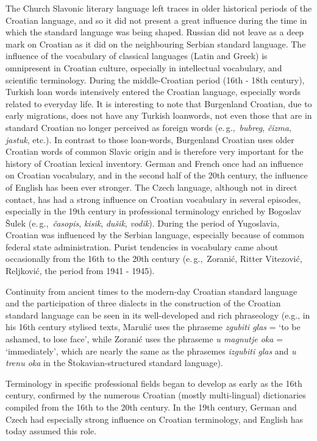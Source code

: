\begin{multicols}{2}
The Church Slavonic literary language left traces in older historical periods of the Croatian language, and so it did not present a great influence during the time in which the standard language was being shaped. Russian did not leave as a deep mark on Croatian as it did on the neighbouring Serbian standard language. The influence of the vocabulary of classical languages (Latin and Greek) is omnipresent in Croatian culture, especially in intellectual vocabulary, and scientific terminology. During the middle-Croatian period (16th - 18th century), Turkish loan words intensively entered the Croatian language, especially words related to everyday life. It is interesting to note that Burgenland Croatian, due to early migrations, does not have any Turkish loanwords, not even those that are in standard Croatian no longer perceived as foreign words (e.\,g.,~\emph{bubreg}, \emph{čizma}, \emph{jastuk}, etc.). In contrast to those loan-words, Burgenland Croatian uses older Croatian words of common Slavic origin and is therefore very important for the history of Croatian lexical inventory. German and French once had an influence on Croatian vocabulary, and in the second half of the 20th century, the influence of English has been ever stronger. The Czech language, although not in direct contact, has had a strong influence on Croatian vocabulary in several episodes, especially in the 19th century in professional terminology enriched by Bogoslav Šulek (e.\,g.,~\emph{časopis}, \emph{kisik}, \emph{dušik}, \emph{vodik}). During the period of Yugoslavia, Croatian was influenced by the Serbian language, especially because of common federal state administration. Purist tendencies in vocabulary came about occasionally from the 16th to the 20th century (e.\,g.,~Zoranić, Ritter Vitezović, Reljković, the period from 1941 - 1945).

Continuity from ancient times to the modern-day Croatian standard language and the participation of three dialects in the construction of the Croatian standard language can be seen in its well-developed and rich phraseology (e.g., in his 16th century stylised texts, Marulić uses the phraseme \emph{zgubiti glas} = ‘to be ashamed, to lose face’, while Zoranić uses the phraseme \emph{u magnutje oka} = ‘immediately’, which are nearly the same as the phrasemes \emph{izgubiti glas} and \emph{u trenu oka} in the Štokavian-structured standard language).

Terminology in specific professional fields began to develop as early as the 16th century, confirmed by the numerous Croatian (mostly multi-lingual) dictionaries compiled from the 16th to the 20th century. In the 19th century, German and Czech had especially strong influence on Croatian terminology, and English has today assumed this role.


\end{multicols}
